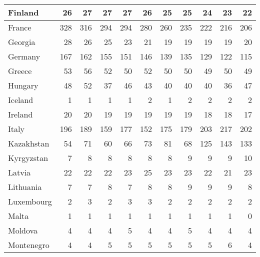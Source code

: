 \begin{table}
\begin{tabular}{|l|r|r|r|r|r|r|r|r|r|r|}
                       Finland&     26&     27&     27&     27&     26&     25&     25&     24&     23&     22\\\hline
                        France&    328&    316&    294&    294&    280&    260&    235&    222&    216&    206\\\hline
                       Georgia&     28&     26&     25&     23&     21&     19&     19&     19&     19&     20\\\hline
                       Germany&    167&    162&    155&    151&    146&    139&    135&    129&    122&    115\\\hline
                        Greece&     53&     56&     52&     50&     52&     50&     50&     49&     50&     49\\\hline
                       Hungary&     48&     52&     37&     46&     43&     40&     40&     40&     36&     47\\\hline
                       Iceland&      1&      1&      1&      1&      2&      1&      2&      2&      2&      2\\\hline
                       Ireland&     20&     20&     19&     19&     19&     19&     19&     18&     18&     17\\\hline
                         Italy&    196&    189&    159&    177&    152&    175&    179&    203&    217&    202\\\hline
                    Kazakhstan&     54&     71&     60&     66&     73&     81&     68&    125&    143&    133\\\hline
                    Kyrgyzstan&      7&      8&      8&      8&      8&      8&      9&      9&      9&     10\\\hline
                        Latvia&     22&     22&     22&     23&     25&     23&     23&     22&     21&     23\\\hline
                     Lithuania&      7&      7&      8&      7&      8&      8&      9&      9&      9&      8\\\hline
                    Luxembourg&      2&      3&      2&      3&      3&      2&      2&      2&      2&      2\\\hline
                         Malta&      1&      1&      1&      1&      1&      1&      1&      1&      1&      0\\\hline
                       Moldova&      4&      4&      4&      5&      4&      4&      5&      4&      4&      4\\\hline
                    Montenegro&      4&      4&      5&      5&      5&      5&      5&      5&      6&      4\\\hline

\end{tabular}
\end{table}

